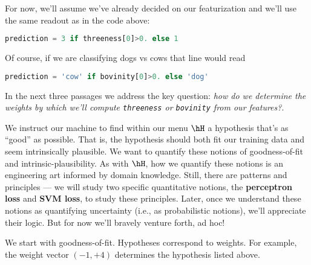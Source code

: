 
  For now, we'll assume we've already decided on our featurization and we'll
  use the same readout as in the
  code above:
  \begin{lstlisting}[language=Python, basicstyle=\footnotesize\ttfamily]
      prediction = 3 if threeness[0]>0. else 1
  \end{lstlisting}
  Of course, if we are classifying dogs vs cows that line would read
  \begin{lstlisting}[language=Python, basicstyle=\footnotesize\ttfamily]
      prediction = 'cow' if bovinity[0]>0. else 'dog'
  \end{lstlisting}
  In the next three passages we address the key question: \emph{how do we
  determine the weights by which we'll compute \texttt{threeness} or
  \texttt{bovinity} from our features?}.

  We instruct our machine to find within our menu $\hH$ a hypothesis that's as
  ``good'' as possible.  That is, the hypothesis should both fit our training
  data and seem intrinsically plausible.  We want to quantify these notions of
  goodness-of-fit and intrinsic-plausibility.  As with $\hH$, how we quantify
  these notions is an engineering art informed by domain knowledge.  Still,
  there are patterns and principles --- we will study two specific quantitative
  notions, the \textbf{perceptron loss} and \textbf{SVM loss}, to study these
  principles.
  Later, once we understand these notions as quantifying uncertainty (i.e., as
  probabilistic notions), we'll appreciate their logic.  But for now we'll
  bravely venture forth, ad hoc!

  We start with goodness-of-fit.  Hypotheses correspond to
  weights.  For example, the weight vector $(-1, +4)$ determines the
  hypothesis listed above.


